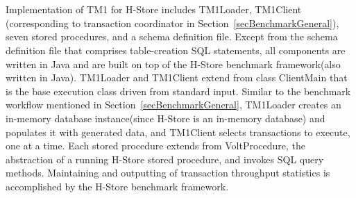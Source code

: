 \documentclass[a4paper,10pt]{article}
\begin{document}
\\\\
Implementation of TM1 for H-Store includes TM1Loader, TM1Client (corresponding to transaction coordinator in Section~\ref{secBenchmarkGeneral}), seven stored procedures, and a schema definition file. Except from the schema definition file that comprises table-creation SQL statements, all components are written in Java and are built on top of the H-Store benchmark framework(also written in Java).  TM1Loader and TM1Client extend from class ClientMain that is the base execution class driven from standard input. Similar to the benchmark workflow mentioned in Section~\ref{secBenchmarkGeneral}, TM1Loader creates an in-memory database instance(since H-Store is an in-memory database) and populates it with generated data, and TM1Client selects transactions to execute, one at a time. Each stored procedure extends from VoltProcedure, the abstraction of a running H-Store stored procedure, and invokes SQL query methods. Maintaining and outputting of transaction throughput statistics is accomplished by the H-Store benchmark framework. 
\end{document}

